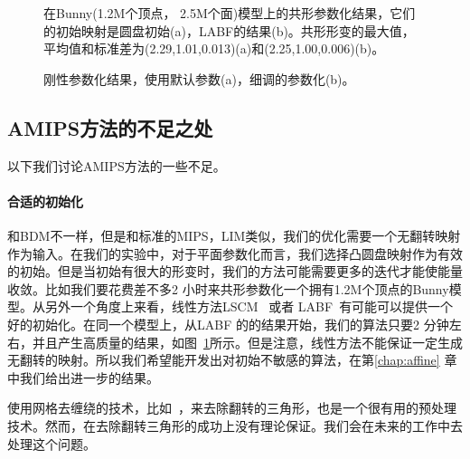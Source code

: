 \begin{figure}[t]
\centerline
{
\hfill
{}
}
\caption{在Bunny(1.2M个顶点， 2.5M个面)模型上的共形参数化结果，它们的初始映射是圆盘初始(a)，LABF的结果(b)。共形形变的最大值，平均值和标准差为(2.29,1.01,0.013)(a)和(2.25,1.00,0.006)(b)。}
\label{fig:big}
\vspace{-3mm}
\end{figure}

\begin{figure}[t]
\centerline
{
\hfill
{}
}
\caption{刚性参数化结果，使用默认参数(a)，细调的参数化(b)。}
\label{fig:fail}
\vspace{-4mm}
\end{figure}

\subsection{AMIPS方法的不足之处}
以下我们讨论AMIPS方法的一些不足。

\paragraph{合适的初始化}
和BDM不一样，但是和标准的MIPS，LIM类似，我们的优化需要一个无翻转映射作为输入。在我们的实验中，对于平面参数化而言，我们选择凸圆盘映射作为有效的初始。但是当初始有很大的形变时，我们的方法可能需要更多的迭代才能使能量收敛。比如我们要花费差不多2 小时来共形参数化一个拥有1.2M个顶点的Bunny模型。从另外一个角度上来看，线性方法LSCM~\cite{Levy2002} 或者 LABF~\cite{Zayer2007}有可能可以提供一个好的初始化。在同一个模型上，从LABF 的的结果开始，我们的算法只要2 分钟左右，并且产生高质量的结果，如图~\ref{fig:big}所示。但是注意，线性方法不能保证一定生成无翻转的映射。所以我们希望能开发出对初始不敏感的算法，在第\ref{chap:affine} 章中我们给出进一步的结果。

使用网格去缠绕的技术，比如~\cite{Escobar2003}，来去除翻转的三角形，也是一个很有用的预处理技术。然而，在去除翻转三角形的成功上没有理论保证。我们会在未来的工作中去处理这个问题。

